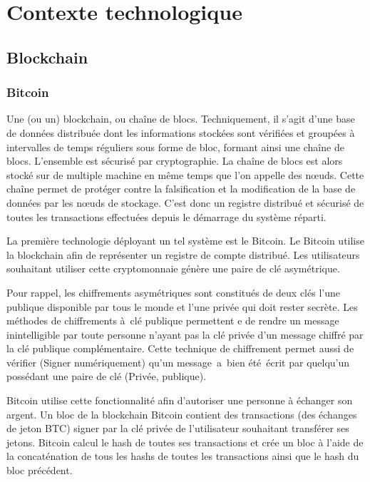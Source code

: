 \section{Contexte technologique}

\subsection{Blockchain}

\subsubsection{Bitcoin}

Une (ou un) blockchain, ou chaîne de blocs.  Techniquement, il s'agit d'une base de données distribuée dont les informations stockées sont vérifiées 
et groupées à intervalles de temps réguliers sous forme de bloc, formant ainsi une chaîne de blocs. L'ensemble est sécurisé par cryptographie. 
La chaîne de blocs est alors stocké sur de multiple machine en même temps que l'on appelle des nœuds. 
Cette chaîne permet de protéger contre la falsification et la modification de la base de données par les nœuds de stockage.
C'est donc un registre distribué et sécurisé de toutes les transactions effectuées depuis le démarrage du système réparti.

La première technologie déployant un tel système est le Bitcoin. Le Bitcoin utilise la blockchain afin de représenter un registre de compte
distribué. Les utilisateurs souhaitant utiliser cette cryptomonnaie génère une paire de clé asymétrique.

Pour rappel, les chiffrements asymétriques sont constitués de deux clés l'une publique disponible par tous le monde et l'une privée qui doit
rester secrète. Les méthodes de chiffrements à clé publique permettent e de rendre un message inintelligible par toute personne n'ayant pas la clé 
privée d'un message chiffré par la clé publique complémentaire. Cette technique de chiffrement permet aussi de vérifier (Signer numériquement) qu'un
message a bien été écrit par quelqu'un possédant une paire de clé (Privée, publique).

Bitcoin utilise cette fonctionnalité afin d'autoriser une personne à échanger son argent. Un bloc de la blockchain Bitcoin contient des transactions
(des échanges de jeton BTC) signer par la clé privée de l'utilisateur souhaitant transférer ses jetons. Bitcoin calcul le hash de toutes ses 
transactions et crée un bloc à l'aide de la concaténation de tous les hashs de toutes les transactions ainsi que le hash du bloc précédent.

